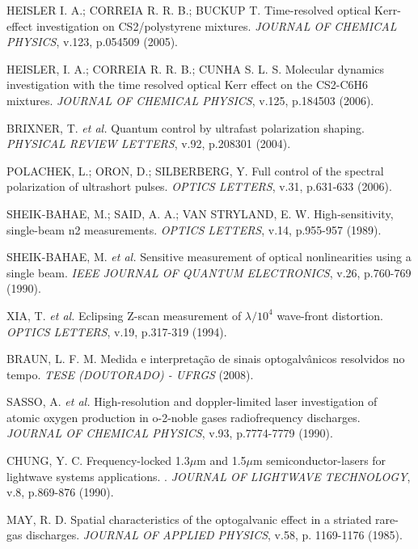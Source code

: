 \begin{thebibliography}{99}
 HEISLER I. A.; CORREIA R. R. B.; BUCKUP T. Time-resolved optical Kerr-effect investigation on CS2/polystyrene mixtures. {\it JOURNAL OF CHEMICAL PHYSICS},  v.123, p.054509 (2005).

 HEISLER, I. A.; CORREIA R. R. B.; CUNHA S. L. S. Molecular dynamics investigation with the time resolved optical Kerr effect on the CS2-C6H6 mixtures. {\it JOURNAL OF CHEMICAL PHYSICS}, v.125, p.184503 (2006).

 BRIXNER, T. {\it et al.} Quantum control by ultrafast polarization shaping. {\it PHYSICAL REVIEW LETTERS}, v.92, p.208301 (2004).

 POLACHEK, L.; ORON, D.; SILBERBERG, Y. Full control of the spectral polarization of ultrashort pulses. {\it OPTICS LETTERS}, v.31, p.631-633 (2006).

 SHEIK-BAHAE, M.; SAID, A. A.; VAN STRYLAND, E. W. High-sensitivity, single-beam n2 measurements. {\it OPTICS LETTERS}, v.14, p.955-957 (1989).

 SHEIK-BAHAE, M. {\it et al.} Sensitive measurement of optical nonlinearities using a single beam. {\it IEEE JOURNAL OF QUANTUM ELECTRONICS}, v.26, p.760-769 (1990).

 XIA, T. {\it et al.} Eclipsing Z-scan measurement of $\lambda/10^4$ wave-front distortion.
 {\it OPTICS LETTERS}, v.19, p.317-319 (1994).

 BRAUN, L. F. M. Medida e interpretação de sinais optogalvânicos resolvidos no tempo. {\it TESE (DOUTORADO) - UFRGS} (2008).


 SASSO, A. {\it et al.} High-resolution and doppler-limited laser investigation of atomic
oxygen production in o-2-noble gases radiofrequency discharges. {\it JOURNAL OF CHEMICAL PHYSICS}, v.93, p.7774-7779 (1990).

 CHUNG, Y. C. Frequency-locked 1.3$\mu$m and 1.5$\mu$m semiconductor-lasers
for lightwave systems applications. . {\it JOURNAL OF LIGHTWAVE TECHNOLOGY}, v.8, p.869-876 (1990).

 MAY, R. D. Spatial characteristics of the optogalvanic effect in a striated rare-gas
discharges. {\it JOURNAL OF APPLIED PHYSICS}, v.58, p. 1169-1176 (1985).


\end{thebibliography}
